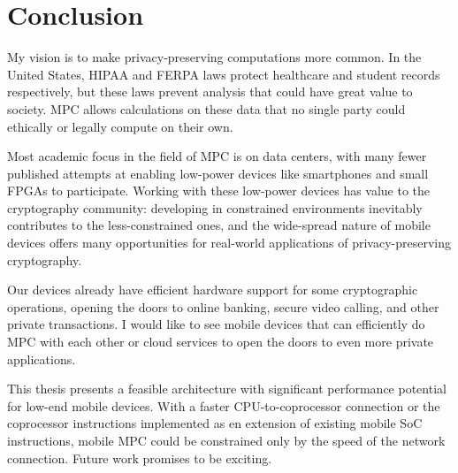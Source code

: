 \section{Conclusion}
My vision is to make privacy-preserving computations more common. In the United States, HIPAA and FERPA laws protect healthcare and student records respectively, but these laws prevent analysis that could have great value to society. MPC allows calculations on these data that no single party could ethically or legally compute on their own.

Most academic focus in the field of MPC is on data centers, with many fewer published attempts at enabling low-power devices like smartphones and small FPGAs to participate. Working with these low-power devices has value to the cryptography community: developing in constrained environments inevitably contributes to the less-constrained ones, and the wide-spread nature of mobile devices offers many opportunities for real-world applications of privacy-preserving cryptography.

Our devices already have efficient hardware support for some cryptographic operations, opening the doors to online banking, secure video calling, and other private transactions. I would like to see mobile devices that can efficiently do MPC with each other or cloud services to open the doors to even more private applications. 

This thesis presents a feasible architecture with significant performance potential for low-end mobile devices. With a faster CPU-to-coprocessor connection or the coprocessor instructions implemented as en extension of existing mobile SoC instructions, mobile MPC could be constrained only by the speed of the network connection. Future work promises to be exciting.
